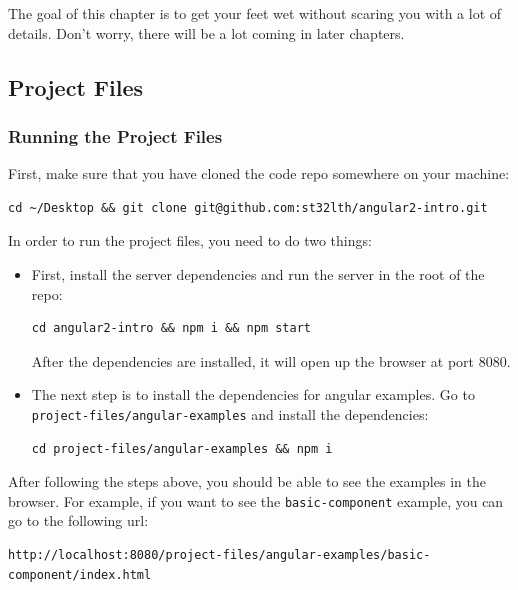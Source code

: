 \documentclass[12pt,]{article}
\begin{document}
The goal of this chapter is to get your feet wet without scaring you
with a lot of details. Don't worry, there will be a lot coming in later
chapters.

\subsection{Project Files}\label{project-files}

\subsubsection{Running the Project
Files}\label{running-the-project-files}

First, make sure that you have cloned the code repo somewhere on your
machine:

\begin{verbatim}
cd ~/Desktop && git clone git@github.com:st32lth/angular2-intro.git
\end{verbatim}

In order to run the project files, you need to do two things:

\begin{itemize}
\item
  First, install the server dependencies and run the server in the root
  of the repo:

\begin{verbatim}
cd angular2-intro && npm i && npm start
\end{verbatim}

  After the dependencies are installed, it will open up the browser at
  port 8080.
\item
  The next step is to install the dependencies for angular examples. Go
  to \texttt{project-files/angular-examples} and install the
  dependencies:

\begin{verbatim}
cd project-files/angular-examples && npm i
\end{verbatim}
\end{itemize}

After following the steps above, you should be able to see the examples
in the browser. For example, if you want to see the
\texttt{basic-component} example, you can go to the following url:

\begin{verbatim}
http://localhost:8080/project-files/angular-examples/basic-component/index.html
\end{verbatim}
\end{document}
